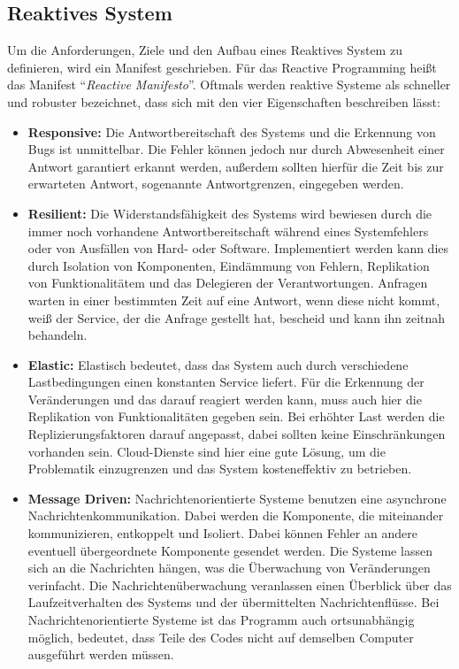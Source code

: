 \subsection*{Reaktives System}
Um die Anforderungen, Ziele und den Aufbau eines Reaktives System zu definieren, wird ein Manifest geschrieben. F\"ur das Reactive Programming hei\ss{}t das Manifest \enquote{\textit{Reactive Manifesto}}\cite{ReaktiveManifest2014}.
Oftmals werden reaktive Systeme als schneller und robuster bezeichnet, dass sich mit den vier Eigenschaften beschreiben l\"asst:
\begin{itemize}
\item \textbf{Responsive:} Die Antwortbereitschaft des Systems und die Erkennung von Bugs ist unmittelbar\cite{Lohmuller2016}. Die Fehler k\"onnen jedoch nur durch Abwesenheit einer Antwort garantiert erkannt werden, au\ss{}erdem  sollten hierf\"ur die Zeit bis zur erwarteten Antwort, sogenannte Antwortgrenzen, eingegeben werden\cite{ReaktiveManifest2014}.

\item \textbf{Resilient:} Die Widerstandsf\"ahigkeit des Systems wird bewiesen durch die immer noch vorhandene Antwortbereitschaft w\"ahrend eines Systemfehlers oder von Ausf\"allen von Hard- oder Software. Implementiert werden kann dies durch Isolation von Komponenten, Eind\"ammung von Fehlern, Replikation von Funktionalit\"atem und das Delegieren der Verantwortungen\cite{ReaktiveManifest2014}. Anfragen warten in einer bestimmten Zeit auf eine Antwort, wenn diese nicht kommt, wei\ss{} der Service, der die Anfrage gestellt hat, bescheid und kann ihn zeitnah behandeln\cite{Lohmuller2016}.

\item \textbf{Elastic:} Elastisch bedeutet, dass das System auch durch verschiedene Lastbedingungen einen konstanten Service liefert. F\"ur die Erkennung der Ver\"anderungen und das darauf reagiert werden kann, muss auch hier die Replikation von Funktionalit\"aten gegeben sein. Bei erh\"ohter Last werden die Replizierungsfaktoren darauf angepasst, dabei sollten keine Einschr\"ankungen vorhanden sein\cite{ReaktiveManifest2014}. Cloud-Dienste sind hier eine gute L\"osung, um die Problematik einzugrenzen und das System kosteneffektiv zu betrieben\cite{Lohmuller2016}.

\item \textbf{Message Driven:} Nachrichtenorientierte Systeme benutzen eine asynchrone Nachrichtenkommunikation. Dabei werden die Komponente, die miteinander kommunizieren, entkoppelt und Isoliert. Dabei k\"onnen Fehler an andere eventuell \"ubergeordnete Komponente gesendet werden. Die Systeme lassen sich an die Nachrichten h\"angen, was die \"Uberwachung von Ver\"anderungen verinfacht\cite{Lohmuller2016}. Die Nachrichten\"uberwachung veranlassen einen \"Uberblick \"uber das Laufzeitverhalten des Systems und der \"ubermittelten Nachrichtenfl\"usse. Bei Nachrichtenorientierte Systeme ist das Programm auch ortsunabh\"angig m\"oglich, bedeutet, dass Teile des Codes nicht auf demselben Computer ausgef\"uhrt werden m\"ussen\cite{ReaktiveManifest2014}.
\end{itemize}

